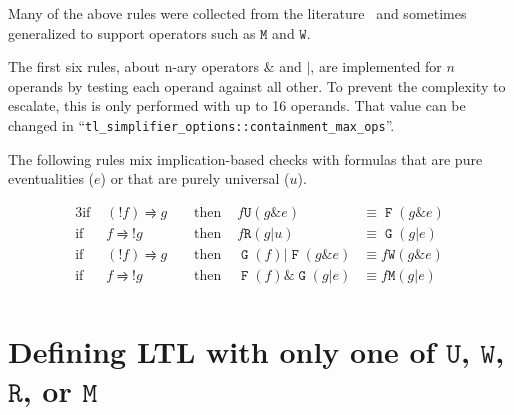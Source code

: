\documentclass[a4paper,twoside,10pt,DIV=12]{scrreprt}
\DeclareMathOperator{\F}{\texttt{F}}
\DeclareMathOperator{\G}{\texttt{G}}
\newcommand{\U}{\mathbin{\texttt{U}}}
\newcommand{\R}{\mathbin{\texttt{R}}}
\newcommand{\M}{\mathbin{\texttt{M}}}
\newcommand{\W}{\mathbin{\texttt{W}}}
\DeclareMathOperator{\NOT}{\texttt{!}}
\newcommand{\OR}{\mathbin{\texttt{|}}}
\newcommand{\AND}{\mathbin{\texttt{\&}}}
\newcommand{\0}{\texttt{0}}
\newcommand{\1}{\texttt{1}}
\def\simp{\rightrightharpoons}
\begin{document}
Many of the above rules were collected from the
literature~\cite{somenzi.00.cav,tauriainen.03.tr,babiak.12.tacas} and
sometimes generalized to support operators such as $\M$ and $\W$.

The first six rules, about n-ary operators $\AND$ and $\OR$, are
implemented for $n$ operands by testing each operand against all
other.  To prevent the complexity to escalate, this is only performed
with up to 16 operands.  That value can be changed in
``\verb|tl_simplifier_options::containment_max_ops|''.

The following rules mix implication-based checks with formulas that
are pure eventualities ($e$) or that are purely universal ($u$).

\allowdisplaybreaks
\begin{alignat*}{3}
\text{if~} & (\NOT f)\simp g  &  & \text{~then~} & f \U (g \AND e)        & \equiv \F(g \AND e)    \\
\text{if~} & f\simp \NOT g    &  & \text{~then~} & f \R (g \OR u)         & \equiv \G(g \OR e)     \\
\text{if~} & (\NOT f) \simp g &  & \text{~then~} & \G(f) \OR \F(g \AND e) & \equiv f \W (g \AND e) \\
\text{if~} & f \simp\NOT g    &  & \text{~then~} & \F(f) \AND \G(g \OR e) & \equiv f \M (g \OR e)  \\
\end{alignat*}

\appendix
\chapter{Defining LTL with only one of $\U$, $\W$, $\R$, or $\M$}
\label{sec:ltl-equiv}
\end{document}
